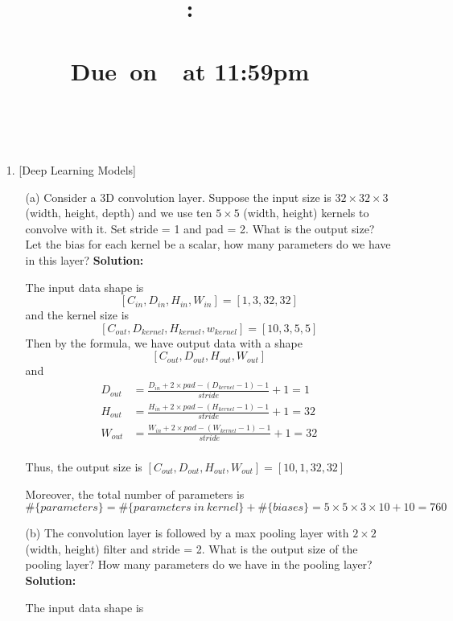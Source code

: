 \documentclass{article}
\title{
    \vspace{2in}
    \textmd{\textbf{\hmwkClass:\\ \hmwkTitle}}\\
    \normalsize\vspace{0.1in}\small{Due\ on\ \hmwkDueDate\ at 11:59pm}\\
    \vspace{0.1in}\large{\textit{\hmwkClassInstructor}}
    \vspace{3in}
}
\author{\textbf{\hmwkAuthorName}\\ \hmwkAuthorID}
\date{}
\begin{document}
    \maketitle
    \pagebreak

    \begin{enumerate}
        \setlength\parindent{2em}
        \item [1.] [{Deep Learning Models}]
        \begin{enumerate}
            \setlength\parindent{2em}
            \item [(a)] Consider a 3D convolution layer.
            Suppose the input size is $32 \times 32 \times 3$ (width, height, depth) and we use ten $5 \times 5$ (width, height) kernels to convolve with it.
            Set stride = 1 and pad = 2.
            What is the output size?
            Let the bias for each kernel be a scalar, how many parameters do we have in this layer?\newline
            {\bf Solution:}
            \par The input data shape is \[[C_{in},D_{in},H_{in},W_{in}] = [1, 3, 32, 32]\] and the kernel size is \[[C_{out}, D_{kernel}, H_{kernel}, w_{kernel}] = [10, 3, 5, 5]\]
            Then by the formula, we have output data with a shape
            \[[C_{out}, D_{out}, H_{out}, W_{out}]\]
            and
            \begin{align*}
                D_{out} &= \frac{D_{in}+2\times pad-(D_{kernel}-1)-1}{stride}+1=1\\
                H_{out} &= \frac{H_{in}+2\times pad-(H_{kernel}-1)-1}{stride}+1=32\\
                W_{out} &= \frac{W_{in}+2\times pad-(W_{kernel}-1)-1}{stride}+1=32\\
            \end{align*}
            \par Thus, the output size is $[C_{out}, D_{out}, H_{out}, W_{out}]=[10,1,32,32]$
            \par Moreover, the total number of parameters is
            \[\#\{parameters\}=\#\{parameters\ in\ kernel\}+\#\{biases\} = 5\times 5\times 3\times 10 + 10=760\]
            \item [(b)] The convolution layer is followed by a max pooling layer with $2 \times 2$ (width, height) filter and stride = 2. What is the output size of the pooling layer? How many parameters do we have in the pooling layer?\newline
            {\bf Solution:}
            \par The input data shape is

\end{enumerate}
\end{enumerate}
\end{document}

